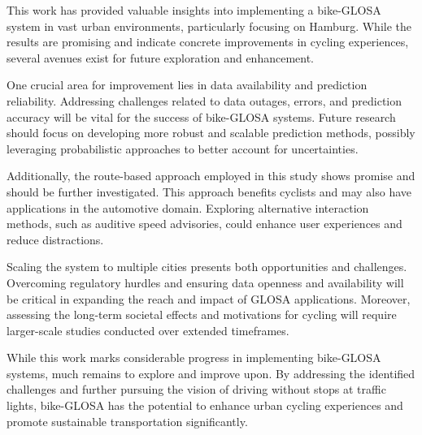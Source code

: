 \begin{Summary}[Outlook]
This work has provided valuable insights into implementing a bike-GLOSA system in vast urban environments, particularly focusing on Hamburg. While the results are promising and indicate concrete improvements in cycling experiences, several avenues exist for future exploration and enhancement.

One crucial area for improvement lies in data availability and prediction reliability. Addressing challenges related to data outages, errors, and prediction accuracy will be vital for the success of bike-GLOSA systems. Future research should focus on developing more robust and scalable prediction methods, possibly leveraging probabilistic approaches to better account for uncertainties.

Additionally, the route-based approach employed in this study shows promise and should be further investigated. This approach benefits cyclists and may also have applications in the automotive domain. Exploring alternative interaction methods, such as auditive speed advisories, could enhance user experiences and reduce distractions.

Scaling the system to multiple cities presents both opportunities and challenges. Overcoming regulatory hurdles and ensuring data openness and availability will be critical in expanding the reach and impact of GLOSA applications. Moreover, assessing the long-term societal effects and motivations for cycling will require larger-scale studies conducted over extended timeframes.

While this work marks considerable progress in implementing bike-GLOSA systems, much remains to explore and improve upon. By addressing the identified challenges and further pursuing the vision of driving without stops at traffic lights, bike-GLOSA has the potential to enhance urban cycling experiences and promote sustainable transportation significantly.
\end{Summary}